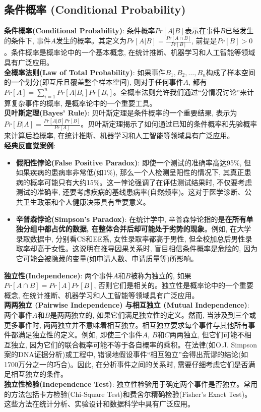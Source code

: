 \documentclass[12pt, a4paper, UTF8]{ctexart}
\newcommand{\term}[1]{\textbf{\textcolor{blue!80!black}{#1}}}
\newcommand{\emphb}[1]{\textbf{#1}}
\begin{document}
\begin{sloppypar}
    \subsection{条件概率 (Conditional Probability)}
    \term{条件概率(Conditional Probability)}: 条件概率$Pr[A|B]$表示在事件$B$已经发生的条件下, 事件$A$发生的概率。其定义为$Pr[A|B] = \frac{Pr[A \cap B]}{Pr[B]}$, 前提是$Pr[B] > 0$。条件概率是概率论中的一个基本概念, 在统计推断、机器学习和人工智能等领域具有广泛应用。\\
    \term{全概率法则(Law of Total Probability)}: 如果事件$B_1, B_2, \dots, B_n$构成了样本空间的一个划分(即互斥且覆盖整个样本空间), 则对于任何事件$A$, 都有$Pr[A] = \sum\limits_{i=1}^{n} Pr[A|B_i] Pr[B_i]$。全概率法则允许我们通过“分情况讨论”来计算复杂事件的概率, 是概率论中的一个重要工具。\\
    \term{贝叶斯定理(Bayes' Rule)}: 贝叶斯定理是条件概率的一个重要结果, 表示为$Pr[B|A] = \frac{Pr[A|B] Pr[B]}{Pr[A]}$。贝叶斯定理揭示了如何通过已知的条件概率和先验概率来计算后验概率, 在统计推断、机器学习和人工智能等领域具有广泛应用。\\
    \emphb{经典反直觉案例}:
    \begin{itemize}[nosep]
        \item \emphb{假阳性悖论(False Positive Paradox)}: 即使一个测试的准确率高达95\%, 但如果疾病的患病率非常低(如1\%), 那么一个人检测呈阳性的情况下, 其真正患病的概率可能只有大约15\%。这一悖论强调了在评估测试结果时, 不仅要考虑测试的准确率, 还要考虑疾病的基线患病率(自然频率)。这对于医学诊断、公共卫生政策和个人健康决策具有重要意义。
        \item \emphb{辛普森悖论(Simpson's Paradox)}: 在统计学中, 辛普森悖论指的是\emphb{在所有单独分组中都占优的数据, 在整体合并后却可能处于劣势的现象}。例如, 在大学录取数据中, 分别看CS和EE系, 女性录取率都高于男性, 但全校加总后男性录取率却高于女性。这说明在推导因果关系时, 盲目相信条件概率是危险的, 因为它可能会被隐藏的变量(如申请人数、申请质量等)所影响。
    \end{itemize}
    \term{独立性(Independence)}: 两个事件$A$和$B$被称为独立的, 如果$Pr[A \cap B] = Pr[A] Pr[B]$, 否则它们是相关的。独立性是概率论中的一个重要概念, 在统计推断、机器学习和人工智能等领域具有广泛应用。\\
    \emphb{两两独立 (Pairwise Independence) 与相互独立 (Mutual Independence)}: 两个事件$A$和$B$是两两独立的, 如果它们满足独立性的定义。然而, 当涉及到三个或更多事件时, 两两独立并不意味着相互独立。相互独立要求每个事件与其他所有事件都满足独立性的定义。例如, 即使三个事件$A$, $B$和$C$两两独立, 但它们可能不相互独立, 因为它们的联合概率可能不等于各自概率的乘积。在法律(如O.J. Simpson案的DNA证据分析)或工程中, 错误地假设事件“相互独立”会得出荒谬的结论(如1700万分之一的巧合)。因此, 在分析事件之间的关系时, 需要仔细考虑它们是否满足相互独立的条件。\\
    \term{独立性检验(Independence Test)}: 独立性检验用于确定两个事件是否独立。常用的方法包括卡方检验(Chi-Square Test)和费舍尔精确检验(Fisher's Exact Test)。这些方法在统计分析、实验设计和数据科学中具有广泛应用。


\end{sloppypar}
\end{document}
